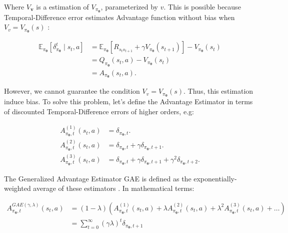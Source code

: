 Where $V_{\boldsymbol{v}}$ is a estimation of $V_{\pi_{\boldsymbol{\theta}}}$, parameterized by $v$. This is possible because Temporal-Difference error estimates Advantage function without bias when $V_{v} = V_{\pi_{\boldsymbol{\theta}}}(s)$ :

\begin{align}
\mathbb{E}_{\pi_{\boldsymbol{\theta}}}[\delta^{t}_{\pi_{\boldsymbol{\theta}}} \mid s_{t},a] 
&= \mathbb{E}_{\pi_{\boldsymbol{\theta}}}[ R_{s_{t}s_{t+1}} + \gamma V_{\pi_{\boldsymbol{\theta}}}(s_{t+1})] - V_{\pi_{\boldsymbol{\theta}}}(s_{t}) \\
&= Q_{\pi_{\boldsymbol{\theta}}}(s_{t},a) - V_{\pi_{\boldsymbol{\theta}}}(s_{t}) \\
&= A_{\pi_{\boldsymbol{\theta}}}(s_{t},a).
\end{align}

However, we cannot guarantee the condition $V_{v} = V_{\pi_{\boldsymbol{\theta}}}(s)$. Thus, this estimation induce bias. To solve this problem, let's define the Advantage Estimator in terms of discounted Temporal-Difference errors of higher orders, e.g:

\begin{align}
A^{(1)}_{\pi_{\boldsymbol{\theta}}, t}(s_{t},a) &= \delta_{\pi_{\boldsymbol{\theta}}, t}. \\
A^{(2)}_{\pi_{\boldsymbol{\theta}}, t}(s_{t},a) &= \delta_{\pi_{\boldsymbol{\theta}}, t} + \gamma \delta_{\pi_{\boldsymbol{\theta}}, t + 1}. \\
A^{(3)}_{\pi_{\boldsymbol{\theta}}, t}(s_{t},a) &= \delta_{\pi_{\boldsymbol{\theta}}, t} + \gamma \delta_{\pi_{\boldsymbol{\theta}}, t + 1} + \gamma^{2}  \delta_{\pi_{\boldsymbol{\theta}}, t + 2}.
\end{align}

The Generalized Advantage Estimator GAE is defined as the exponentially-weighted average of these estimators \cite{DBLP:journals/corr/SchulmanMLJA15}. In mathematical terms:

\begin{align}
A^{GAE(\gamma, \lambda)}_{\pi_{\boldsymbol{\theta}}, t}(s_{t},a) &= (1 - \lambda)(A^{(1)}_{\pi_{\boldsymbol{\theta}}, t}(s_{t},a) + \lambda A^{(2)}_{\pi_{\boldsymbol{\theta}}, t}(s_{t},a) + \lambda^{2} A^{(3)}_{\pi_{\boldsymbol{\theta}}, t}(s_{t},a) + \dots)\label{eq:gae1} \\
&= \sum_{t = 0}^{\infty} (\gamma \lambda)^{t} \delta_{\pi_{\boldsymbol{\theta}}, t+1} \label{eq:gae2}
\end{align}

